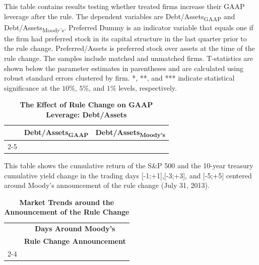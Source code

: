 \documentclass[a4paper, 12pt]{article}
\begin{document}
\begin{table}[htbp]
\caption{\textbf{The Effect of Rule Change on GAAP Leverage: Debt/Assets}} \label{table_bla_c}
\begin{singlespace}
\begin{small}

\noindent This table contains results testing whether treated firms increase their GAAP leverage after the rule. The dependent variables are Debt/Assets\textsubscript{GAAP} and Debt/Assets\textsubscript{Moody's}. Preferred Dummy is an indicator variable that equals one if the firm had preferred stock in its capital structure in the last quarter prior to the rule change. Preferred/Assets is preferred stock over assets at the time of the rule change. The samples include matched and unmatched firms. T-statistics are shown below the parameter estimates in parentheses and are calculated using robust standard errors clustered by firm. *, **, and *** indicate statistical significance at the $10\%$, $5\%$, and $1\%$ levels, respectively.

\end{small}
\end{singlespace}
\vspace{3mm}
\small
  \centering
    \begin{tabular}{lcccc}
    \toprule
    \textbf{ } &
      \multicolumn{2}{c}{\textbf{Debt/Assets\textsubscript{GAAP}}} &
       \multicolumn{2}{c}{\textbf{Debt/Assets\textsubscript{Moody's}}}
      \\
      \cline{2-5}

  


    \bottomrule
    \end{tabular}
\end{table}
\clearpage

\newpage

\begin{table}[htbp]
\caption{\textbf{Market Trends around the Announcement of the Rule Change}} \label{table_carnews}
\begin{singlespace}
\begin{small}

\noindent This table shows the cumulative return of the S\&P 500 and the 10-year treasury cumulative yield change in the trading days [-1;+1],[-3;+3], and [-5;+5] centered around Moody's announcement of the rule change (July 31, 2013).

\end{small}
\end{singlespace}
\vspace{3mm}
\small
  \centering
    \begin{tabular}{lccc}
    \toprule
    \textbf{ } &
      \multicolumn{3}{c}{\textbf{Days Around Moody's}}\\
          \textbf{ } &
      \multicolumn{3}{c}{\textbf{Rule Change Announcement}}
      \\
      \cline{2-4}



    \bottomrule
    \end{tabular}
\end{table}
\clearpage
\end{document}
